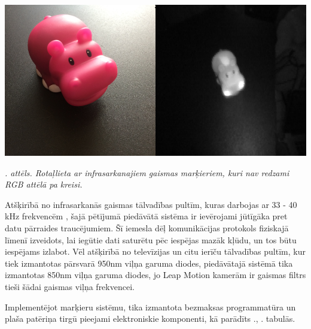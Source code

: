 \documentclass[12pt, a4paper, oneside, openright]{article}
\renewcommand{\thecimages}{\arabic{cimages}}
\begin{document}
\label{cimages:begemot_sample_1}
\vspace{10pt}
\begin{samepage}
\begin{center}
\includegraphics[width=0.6\columnwidth]{images/begemot_sample_1.png}
\begin{center}
\footnotesize{
\textit{\thecimages. attēls. Rotaļlieta ar infrasarkanajiem gaismas marķieriem, kuri nav redzami RGB attēlā pa kreisi.}}
\end{center}
\end{center}
\end{samepage}

\par
Atšķirībā no infrasarkanās gaismas tālvadības pultīm, kuras darbojas ar 33 - 40 kHz frekvencēm \cite{ThibautRaharijaona2010}, šajā pētījumā
piedāvātā sistēma ir ievērojami jūtīgāka pret datu pārraides traucējumiem. 
Šī iemesla dēļ komunikācijas protokols fiziskajā līmenī izveidots, lai iegūtie dati saturētu
pēc iespējas mazāk kļūdu, un tos būtu iespējams izlabot. Vēl atšķirībā no televīzijas un citu
ierīču tālvadības pultīm, kur tiek izmantotas pārsvarā 950nm viļņa garuma diodes,
piedāvātajā sistēmā tika izmantotas 850nm viļņa garuma diodes, jo Leap Motion kamerām ir
gaismas filtrs tieši šādai gaismas viļņa frekvencei.

\newpage
\par
Implementējot marķieru sistēmu, tika izmantota bezmaksas programmatūra un plaša patēriņa tirgū
pieejami elektroniskie komponenti, kā parādīts ., . tabulās.
\end{document}
